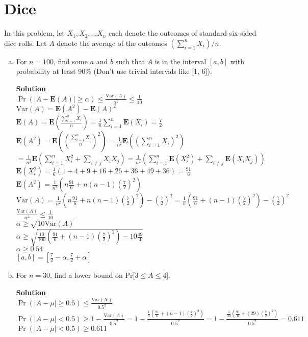 \documentclass[11pt]{article}
\newcommand*{\Question}[1]{\section{#1}}
\newenvironment{Answer}{\vspace{10pt}\begin{mdframed}\textbf{Solution}\\}{\end{mdframed}\vfill\pagebreak[3]}
\newenvironment{Answer}{\vspace{10pt}}{\vfill\pagebreak[3]}
\newcommand*{\E}{\textbf{E}}
\newcommand*{\Var}[1]{\text{Var}(#1)}
\begin{document}
\Question{Dice}
In this problem, let $X_1, X_2, \dots X_n$ each denote the outcomes of standard six-sided dice rolls. Let $A$ denote the average of the outcomes $(\sum_{i = 1}^n X_i)/n$.
\begin{enumerate}[(a)]
  \item For $n = 100$, find some $a$ and $b$ such that $A$ is in the interval $[a, b]$ with probability at least 90\% (Don't use trivial intervals like [1, 6]).
  \begin{Answer}
$\Pr(|A-\E(A)| \geq \alpha) \leq \frac{\Var{A}}{\alpha^2} \leq \frac{1}{10}$\\
$\Var{A}=\E(A^2)-\E(A)^2$\\
$\E(A)=\E(\frac{\sum_{i=1}^nX_i}{n})=\frac{1}{n}\sum_{i=1}^n\E(X_i)=\frac{7}{2}$\\
$\E(A^2)=\E((\frac{\sum_{i=1}^nX_i}{n})^2)=\frac{1}{n^2}\E((\sum_{i=1}^nX_i)^2)$\\
$=\frac{1}{n^2}\E(\sum_{i=1}^nX_i^2+\sum_{i \neq j}X_iX_j)=\frac{1}{n^2}(\sum_{i=1}^n\E(X_i^2)+\sum_{i \neq j}\E(X_iX_j))$\\
$\E(X_i^2)=\frac{1}{6}(1+4+9+16+25+36+49+36)=\frac{91}{6}$\\
$\E(A^2)=\frac{1}{n^2}(n\frac{91}{6}+n(n-1)(\frac{7}{2})^2)$\\
$\Var{A}=\frac{1}{n^2}(n\frac{91}{6}+n(n-1)(\frac{7}{2})^2)-(\frac{7}{2})^2=\frac{1}{n}(\frac{91}{6}+(n-1)(\frac{7}{2})^2)-(\frac{7}{2})^2$\\
$\frac{\Var{A}}{\alpha^2} \leq \frac{1}{10}$\\
$\alpha \geq \sqrt{10\Var{A}}$\\
$\alpha \geq \sqrt{\frac{10}{100}(\frac{91}{6}+(n-1)(\frac{7}{2})^2)-10\frac{49}{4}}$\\
$\alpha \geq 0.54$\\
$[a,b]=[\frac{7}{2}-\alpha,\frac{7}{2}+\alpha]$
  \end{Answer}

  \item For $n = 30$, find a lower bound on Pr[$3\leq A\leq 4$].
  \begin{Answer}
$\Pr(|A-\mu| \geq 0.5) \leq \frac{\Var{X}}{0.5^2}$\\
$\Pr(|A-\mu|<0.5) \geq 1-\frac{\Var{A}}{0.5^2}=1-\frac{\frac{1}{n}(\frac{91}{6}+(n-1)(\frac{7}{2})^2)}{0.5^2}=1-\frac{\frac{1}{30}(\frac{91}{6}+(29)(\frac{7}{2})^2)}{0.5^2}=0.611$\\
$\Pr(|A-\mu|<0.5) \geq 0.611$

  \end{Answer}


\end{enumerate}
\end{document}
